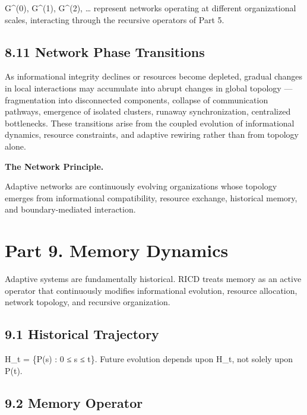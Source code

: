\documentclass[
]{article}
\begin{document}
G\^{}(0), G\^{}(1), G\^{}(2), \ldots{} represent networks operating at
different organizational scales, interacting through the recursive
operators of Part 5.

\hypertarget{network-phase-transitions}{%
\subsection{8.11 Network Phase
Transitions}\label{network-phase-transitions}}

As informational integrity declines or resources become depleted,
gradual changes in local interactions may accumulate into abrupt changes
in global topology --- fragmentation into disconnected components,
collapse of communication pathways, emergence of isolated clusters,
runaway synchronization, centralized bottlenecks. These transitions
arise from the coupled evolution of informational dynamics, resource
constraints, and adaptive rewiring rather than from topology alone.

\textbf{The Network Principle.}

Adaptive networks are continuously evolving organizations whose topology
emerges from informational compatibility, resource exchange, historical
memory, and boundary-mediated interaction.

\hypertarget{part-9.-memory-dynamics}{%
\section{Part 9. Memory Dynamics}\label{part-9.-memory-dynamics}}

Adaptive systems are fundamentally historical. RICD treats memory as an
active operator that continuously modifies informational evolution,
resource allocation, network topology, and recursive organization.

\hypertarget{historical-trajectory}{%
\subsection{9.1 Historical Trajectory}\label{historical-trajectory}}

H\_t = \{P(s) : 0 ≤ s ≤ t\}. Future evolution depends upon H\_t, not
solely upon P(t).

\hypertarget{memory-operator}{%
\subsection{9.2 Memory Operator}\label{memory-operator}}
\end{document}
